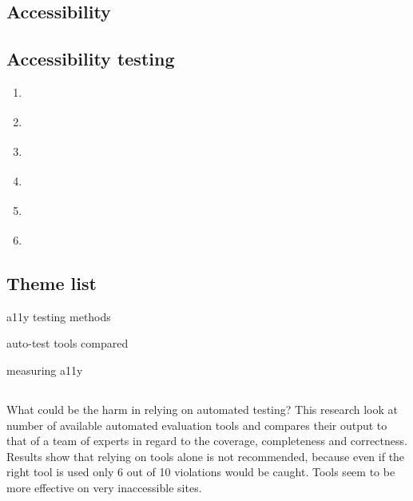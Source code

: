 \documentclass{master_thesis}
\begin{document}
\subsection*{Accessibility}
\subsection*{Accessibility testing}
\begin{enumerate}
	\item \cite{DequeSystems2021}
	\item \cite{AbouZahra2017}
	\item \cite{Sane2021}
	\item \cite{Thornton2022}
	\item \cite{RybinKoob2022}
	\item \cite{Ismailova2022}
\end{enumerate}

\subsection*{Theme list}
\begin{list}{-}{}
	\item a11y testing methods
	\item auto-test tools compared
	\item measuring a11y
\end{list}

\subsection*{\citep{Vigo2013}}
What could be the harm in relying on automated testing? This research look at number of available automated evaluation tools and compares their output to that of a team of experts in regard to the coverage, completeness and correctness. Results show that relying on tools alone is not recommended, because even if the right tool is used only 6 out of 10 violations would be caught. Tools seem to be more effective on very inaccessible sites.

\printbibliography
\end{document}
